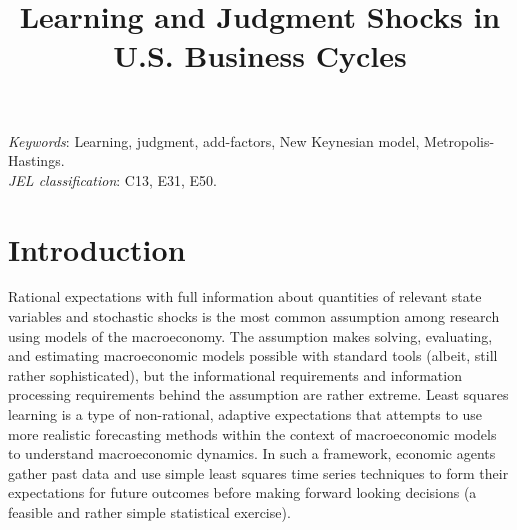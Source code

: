 \documentclass[10pt]{article}
\begin{document}
\begin{titlepage}
\begin{singlespace}
\title{Learning and Judgment Shocks in U.S. Business Cycles}

\maketitle

\thispagestyle{empty}

\newline  

\noindent \textit{Keywords}: Learning, judgment, add-factors, New Keynesian model, Metropolis-Hastings. \\
\noindent \textit{JEL classification}: C13, E31, E50.
\end{singlespace}
\end{titlepage}

\newpage

\section{Introduction}

Rational expectations with full information about quantities of relevant state variables and stochastic shocks is the most common assumption among research using models of the macroeconomy.  The assumption makes solving, evaluating, and estimating macroeconomic models possible with standard tools (albeit, still rather sophisticated), but the informational requirements and information processing requirements behind the assumption are rather extreme.  Least squares learning is a type of non-rational, adaptive expectations that attempts to use more realistic forecasting methods within the context of macroeconomic models to understand macroeconomic dynamics.  In such a framework, economic agents gather past data and use simple least squares time series techniques to form their expectations for future outcomes before making forward looking decisions (a feasible and rather simple statistical exercise). 
\end{document}
